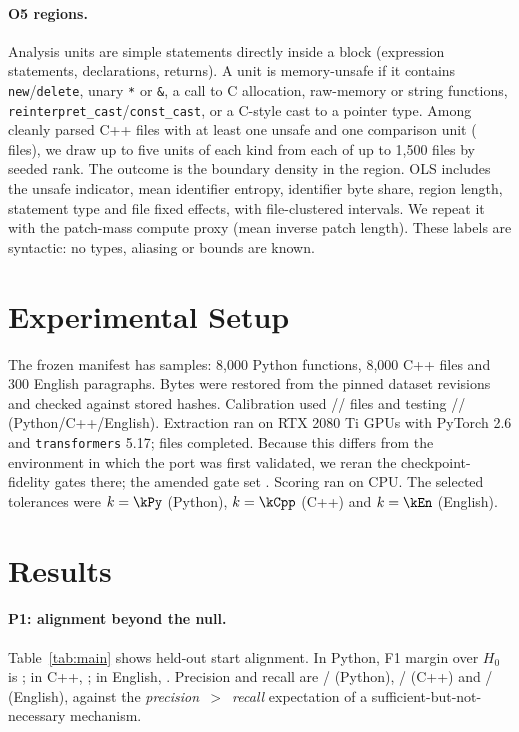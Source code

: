 \paragraph{O5 regions.} Analysis units are simple statements directly inside a block (expression statements, declarations, returns). A unit is memory-unsafe if it contains \texttt{new}/\texttt{delete}, unary \texttt{*} or \texttt{\&}, a call to C allocation, raw-memory or string functions, \texttt{reinterpret\_cast}/\texttt{const\_cast}, or a C-style cast to a pointer type. Among cleanly parsed C++ files with at least one unsafe and one comparison unit (\OFiveEligible{} files), we draw up to five units of each kind from each of up to 1{,}500 files by seeded rank. The outcome is the boundary density in the region. OLS includes the unsafe indicator, mean identifier entropy, identifier byte share, region length, statement type and file fixed effects, with file-clustered intervals. We repeat it with the patch-mass compute proxy (mean inverse patch length). These labels are syntactic: no types, aliasing or bounds are known.

\section{Experimental Setup}
The frozen manifest has \nSamples{} samples: 8{,}000 Python functions, 8{,}000 C++ files and 300 English paragraphs. Bytes were restored from the pinned dataset revisions and checked against stored hashes. Calibration used \nCalPy{}/\nCalCpp{}/\nCalEn{} files and testing \nTestPy{}/\nTestCpp{}/\nTestEn{} (Python/C++/English). Extraction ran on RTX 2080 Ti GPUs with PyTorch 2.6 and \texttt{transformers} 5.17; \nExtracted{} files completed. Because this differs from the environment in which the port was first validated, we reran the checkpoint-fidelity gates there; the amended gate set \FidelityAda{}. Scoring ran on CPU. The selected tolerances were $k=\kPy$ (Python), $k=\kCpp$ (C++) and $k=\kEn$ (English).

\section{Results}
\TableMain
\paragraph{P1: alignment beyond the null.} Table~\ref{tab:main} shows held-out start alignment. In Python, F1 margin over $H_0$ is \MarginPy{} \MarginCIPy{}; in C++, \MarginCpp{} \MarginCICpp{}; in English, \MarginEn{} \MarginCIEn{}. Precision and recall are \PrecPy{}/\RecPy{} (Python), \PrecCpp{}/\RecCpp{} (C++) and \PrecEn{}/\RecEn{} (English), against the \emph{precision~$>$~recall} expectation of a sufficient-but-not-necessary mechanism.

